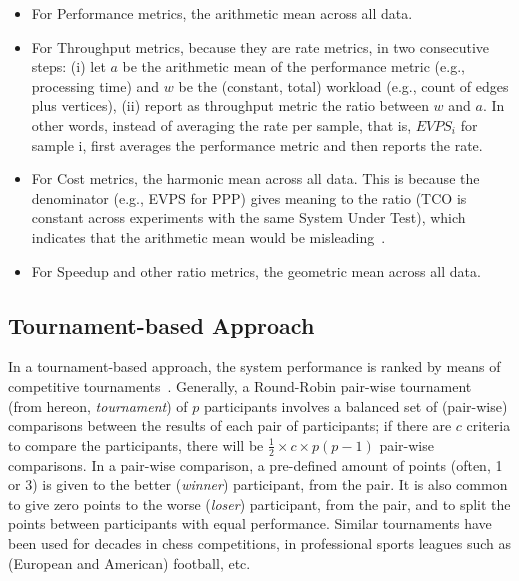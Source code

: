 \begin{itemize}
	\item For Performance metrics, the arithmetic mean across all data.
	\item For Throughput metrics, because they are rate metrics, in two consecutive steps: (i) let $a$ be the arithmetic mean of the performance metric (e.g., processing time) and $w$ be the (constant, total) workload (e.g., count of edges plus vertices), (ii) report as throughput metric the ratio between $w$ and $a$. In other words, instead of averaging the rate per sample, that is, $\textit{EVPS}_i$ for sample i, \toolname{} first averages the performance metric and then reports the rate.
	\item For Cost metrics, the harmonic mean across all data. This is because the denominator (e.g., EVPS for PPP) gives meaning to the ratio (TCO is constant across experiments with the same System Under Test), which indicates that the arithmetic mean would be misleading~\cite[S.3.1.1]{DBLP:conf/sc/HoeflerB15}.
	\item For Speedup and other ratio metrics, the geometric mean across all data.
\end{itemize}








\subsection{Tournament-based Approach} \label{sec:competitions:tournament}
In a tournament-based approach, the system performance is ranked by means of competitive tournaments~\cite{Thurstone1927}.  Generally, a Round-Robin pair-wise tournament~\cite{David1960} (from hereon, {\it tournament}) of $p$ participants involves a balanced set of (pair-wise) comparisons between the results of each pair of participants; if there are $c$ criteria to compare the participants, there will be $\frac{1}{2} \times c \times p (p - 1)$ pair-wise comparisons. In a pair-wise comparison, a pre-defined amount of points (often, 1 or 3) is given to the better ({\it winner}) participant, from the pair. It is also common to give zero points to the worse ({\it loser}) participant, from the pair, and to split the points between participants with equal performance. Similar tournaments have been used for decades in chess competitions, in professional sports leagues such as (European and American) football, etc.

